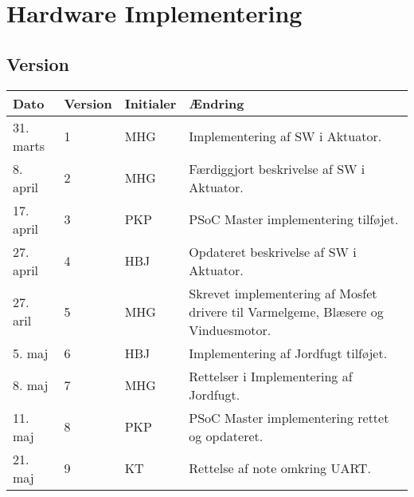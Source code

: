 \chapter{Hardware Implementering} \label{ch:HwImpl}

\section*{Version}
\begin{table}[h]
	\centering
	\begin{tabularx}{\textwidth - 2cm}{|l|l|l|X|}
	\hline
	Dato	& Version	& Initialer & Ændring	\\ \hline
	31. marts & 1 & MHG & Implementering af SW i Aktuator. \\ \hline
	8. april & 2 & MHG & Færdiggjort beskrivelse af SW i Aktuator. \\\hline
	17. april & 3 & PKP & PSoC Master implementering tilføjet. \\\hline
	27. april & 4 & HBJ & Opdateret beskrivelse af SW i Aktuator. \\\hline
	27. aril & 5 & MHG & Skrevet implementering af Mosfet drivere til Varmelgeme, Blæsere og Vinduesmotor. \\\hline
	5. maj & 6 & HBJ & Implementering af Jordfugt tilføjet. \\\hline
	8. maj & 7 & MHG & Rettelser i Implementering af Jordfugt. \\\hline
	11. maj & 8 & PKP & PSoC Master implementering rettet og opdateret. \\\hline
	21. maj & 9 & KT & Rettelse af note omkring UART. \\\hline
	\end{tabularx}
\end{table}

\clearpage



